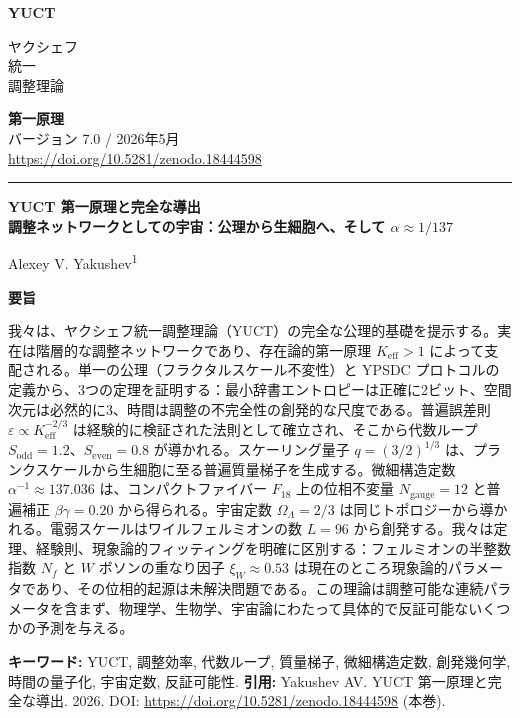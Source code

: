 \documentclass[12pt,a4paper]{article}
\newcommand{\makeheader}{%
	\noindent
	\begin{minipage}{0.17\textwidth}
		\raggedright
		{\sffamily\bfseries\color{skyblue}\fontsize{46}{46}\selectfont YUCT}%
	\end{minipage}%
	\hspace{30pt}
	\begin{minipage}{0.32\textwidth}
		\raggedright
		{\sffamily\fontsize{11}{13}\selectfont ヤクシェフ\\ 統一\\ 調整理論}%
	\end{minipage}%
	\hfill
	\begin{minipage}{0.38\textwidth}
		\raggedleft
		{\sffamily\bfseries 第一原理}\\ 
		{\sffamily バージョン 7.0 / 2026年5月}\\ 
		{\sffamily\footnotesize \scriptsize \url{https://doi.org/10.5281/zenodo.18444598}}%
	\end{minipage}
	\par\vspace{5pt}
	\noindent\textcolor{gold}{\rule{\textwidth}{1.6pt}}
	\par\vspace{0pt}
}
\begin{document}
	
	\thispagestyle{firstpage}
	\makeheader
	
	\vspace{0cm}
	{\LARGE\bfseries YUCT 第一原理と完全な導出 \\
		\Large 調整ネットワークとしての宇宙：公理から生細胞へ、そして \(\alpha \approx 1/137\) \par}
	\vspace{0.2cm}
	
	{\large Alexey V. Yakushev\textsuperscript{1}} \\
	\vspace{0.0cm}
	
	{\color{darkblue}\textbf{\LARGE 要旨}} \par
	{\large
		\noindent
		我々は、ヤクシェフ統一調整理論（YUCT）の完全な公理的基礎を提示する。実在は階層的な調整ネットワークであり、存在論的第一原理 \(K_{\mathrm{eff}} > 1\) によって支配される。単一の公理（フラクタルスケール不変性）と YPSDC プロトコルの定義から、3つの定理を証明する：最小辞書エントロピーは正確に2ビット、空間次元は必然的に3、時間は調整の不完全性の創発的な尺度である。普遍誤差則 \(\varepsilon \propto K_{\mathrm{eff}}^{-2/3}\) は経験的に検証された法則として確立され、そこから代数ループ \(S_{\mathrm{odd}} = 1.2\)、\(S_{\mathrm{even}} = 0.8\) が導かれる。スケーリング量子 \(q = (3/2)^{1/3}\) は、プランクスケールから生細胞に至る普遍質量梯子を生成する。微細構造定数 \(\alpha^{-1} \approx 137.036\) は、コンパクトファイバー \(F_{18}\) 上の位相不変量 \(N_{\mathrm{gauge}} = 12\) と普遍補正 \(\beta\gamma = 0.20\) から得られる。宇宙定数 \(\Omega_\Lambda = 2/3\) は同じトポロジーから導かれる。電弱スケールはワイルフェルミオンの数 \(L = 96\) から創発する。我々は定理、経験則、現象論的フィッティングを明確に区別する：フェルミオンの半整数指数 \(N_f\) と \(W\) ボソンの重なり因子 \(\xi_W \approx 0.53\) は現在のところ現象論的パラメータであり、その位相的起源は未解決問題である。この理論は調整可能な連続パラメータを含まず、物理学、生物学、宇宙論にわたって具体的で反証可能ないくつかの予測を与える。
	}
	
	\vspace{0.1cm}
	\noindent
	{\color{darkblue}\textbf{キーワード:}} YUCT, 調整効率, 代数ループ, 質量梯子, 微細構造定数, 創発幾何学, 時間の量子化, 宇宙定数, 反証可能性.
	\vspace{0.1cm}
	\noindent
	{\color{darkblue}\textbf{引用:}} Yakushev AV. YUCT 第一原理と完全な導出. 2026. DOI: \url{https://doi.org/10.5281/zenodo.18444598} (本巻).
	
	\vspace{0.4cm}
	
\end{document}
